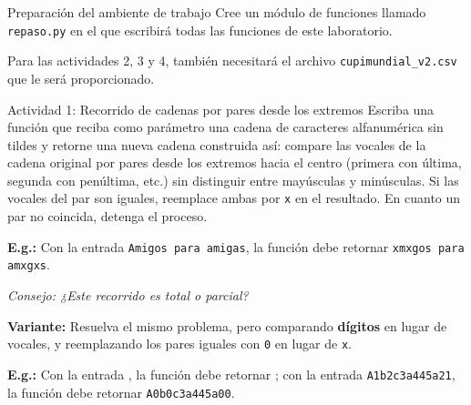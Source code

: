 \documentclass{ip-lab}
\begin{document}
\maketitle

\begin{sectionbox}{Preparación del ambiente de trabajo}
  Cree un módulo de funciones llamado \texttt{repaso.py} en el que escribirá todas las funciones de este laboratorio.

  Para las actividades 2, 3 y 4, también necesitará el archivo \texttt{cupimundial\_v2.csv} que le será proporcionado.
\end{sectionbox}

\begin{sectionbox}{Actividad 1: Recorrido de cadenas por pares desde los extremos}
  Escriba una función que reciba como parámetro una cadena de caracteres alfanumérica sin tildes y retorne una nueva cadena construida así: compare las vocales de la cadena original por pares desde los extremos hacia el centro (primera con última, segunda con penúltima, etc.) sin distinguir entre mayúsculas y minúsculas. Si las vocales del par son iguales, reemplace ambas por \texttt{x} en el resultado. En cuanto un par no coincida, detenga el proceso.

  \textbf{E.g.:} Con la entrada \texttt{\textquotedbl Amigos para amigas\textquotedbl}, la función debe retornar \texttt{\textquotedbl xmxgos para amxgxs\textquotedbl}.

  \textit{Consejo: ¿Este recorrido es total o parcial?}

  \medskip

  \textbf{Variante:} Resuelva el mismo problema, pero comparando \textbf{dígitos} en lugar de vocales, y reemplazando los pares iguales con \texttt{0} en lugar de \texttt{x}.

  \textbf{E.g.:} Con la entrada \texttt{\textquotedbl}, la función debe retornar \texttt{\textquotedbl}; con la entrada \texttt{\textquotedbl A1b2c3a445a21\textquotedbl}, la función debe retornar \texttt{\textquotedbl A0b0c3a445a00\textquotedbl}.
\end{sectionbox}

\pagebreak
\end{document}
